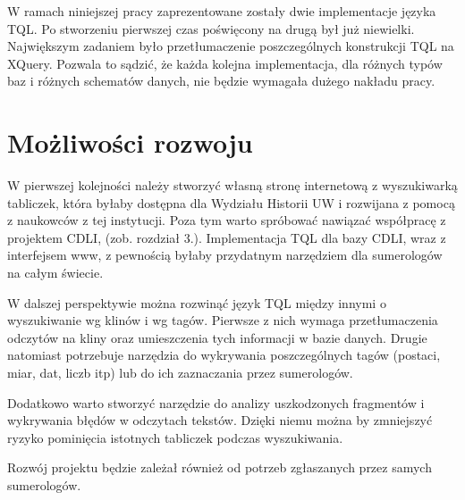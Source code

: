 W ramach niniejszej pracy zaprezentowane zostały dwie implementacje języka TQL. 
Po stworzeniu pierwszej czas poświęcony na drugą był już niewielki. 
Największym zadaniem było przetłumaczenie poszczególnych konstrukcji TQL na XQuery. 
Pozwala to sądzić, że każda kolejna implementacja, dla różnych typów baz i różnych schematów danych, 
nie będzie wymagała dużego nakładu pracy. 



\section*{Możliwości rozwoju}
W pierwszej kolejności należy stworzyć własną stronę internetową z wyszukiwarką tabliczek, 
która byłaby dostępna dla Wydziału Historii UW i rozwijana z pomocą z naukowców z tej instytucji. 
Poza tym warto spróbować nawiązać współpracę z projektem CDLI, (zob. rozdział 3.).
Implementacja TQL dla bazy CDLI, wraz z interfejsem www, z pewnością byłaby przydatnym narzędziem dla sumerologów na całym świecie.

W dalszej perspektywie można rozwinąć język TQL między innymi o wyszukiwanie wg klinów i wg tagów. 
Pierwsze z nich wymaga przetłumaczenia odczytów na kliny oraz umieszczenia tych informacji w bazie danych.
Drugie natomiast potrzebuje narzędzia do wykrywania poszczególnych tagów
(postaci, miar, dat, liczb itp) lub do ich zaznaczania przez sumerologów.

Dodatkowo warto stworzyć narzędzie do analizy uszkodzonych fragmentów i wykrywania błędów w odczytach tekstów. 
Dzięki niemu można by zmniejszyć ryzyko pominięcia istotnych tabliczek podczas wyszukiwania. 

Rozwój projektu będzie zależał również od potrzeb zgłaszanych przez samych sumerologów.
